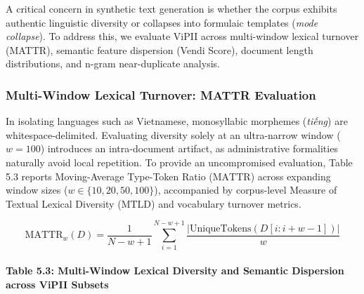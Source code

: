 \documentclass[
]{article}
\begin{document}
A critical concern in synthetic text generation is whether the corpus
exhibits authentic linguistic diversity or collapses into formulaic
templates (\emph{mode collapse}). To address this, we evaluate ViPII
across multi-window lexical turnover (MATTR), semantic feature
dispersion (Vendi Score), document length distributions, and n-gram
near-duplicate analysis.

\subsubsection{Multi-Window Lexical Turnover: MATTR
Evaluation}\label{multi-window-lexical-turnover-mattr-evaluation}

In isolating languages such as Vietnamese, monosyllabic morphemes
(\emph{tiếng}) are whitespace-delimited. Evaluating diversity solely at
an ultra-narrow window (\(w=100\)) introduces an intra-document
artifact, as administrative formalities naturally avoid local
repetition. To provide an uncompromised evaluation, Table 5.3 reports
Moving-Average Type-Token Ratio (\(\text{MATTR}\)) across expanding
window sizes (\(w \in \{10, 20, 50, 100\}\)), accompanied by
corpus-level Measure of Textual Lexical Diversity (\(\text{MTLD}\)) and
vocabulary turnover metrics.

\[\text{MATTR}_w(D) = \frac{1}{N - w + 1} \sum_{i=1}^{N - w + 1} \frac{|\text{UniqueTokens}(D[i : i+w-1])|}{w}\]

\paragraph{Table 5.3: Multi-Window Lexical Diversity and Semantic
Dispersion across ViPII
Subsets}\label{table-5.3-multi-window-lexical-diversity-and-semantic-dispersion-across-vipii-subsets}
\end{document}
